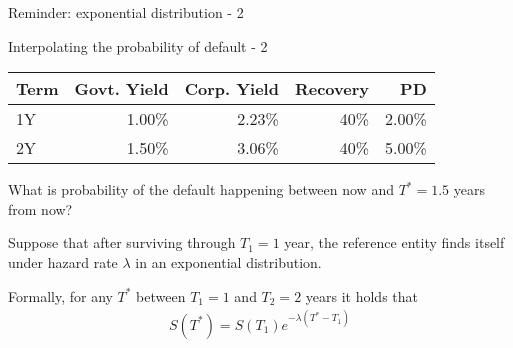 \documentclass{beamer}
\begin{document}
\begin{frame}{Reminder: exponential distribution - 2}
\centering
{}
\end{frame}



\begin{frame}{Interpolating the probability of default - 2}
\centering
\begin{tabular}{l|r|r|r|r}
Term & Govt. Yield & Corp. Yield & Recovery & PD \\ \hline
1Y & 1.00\% & 2.23\% & 40\% & 2.00\% \\
2Y & 1.50\% & 3.06\% & 40\% & 5.00\%
\end{tabular}

\justify
What is probability of the default happening between now and $T^*=1.5$ years from now?

\justify
Suppose that after surviving through $T_1=1$ year, the reference entity finds itself under hazard rate $\lambda$ in an exponential distribution.

\justify
Formally, for any $T^*$ between $T_1=1$ and $T_2=2$ years it holds that
\begin{align*}
S(T^*) = S(T_1)e^{-\lambda(T^* - T_1)}
\end{align*}
\end{frame}





\newcommand{\nodeWithDropLines}[2]{
    \node[
        circle,
        fill,
        color=Set1-A,
        inner sep=2pt
    ]
    at (axis cs: #1, #2)
    {};

    \draw[
        dashed,
        thick
    ]
    (axis cs: 0, #2) -- (axis cs: #1, #2) -- (axis cs: #1, 0);
}
\end{document}
